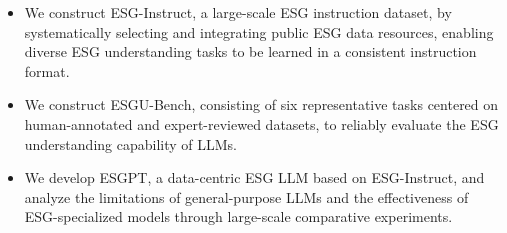 \documentclass[11pt]{article}
\begin{document}
\begin{itemize}
    \item We construct \textsf{ESG-Instruct}, a large-scale ESG instruction dataset, by systematically selecting and integrating public ESG data resources, enabling diverse ESG understanding tasks to be learned in a consistent instruction format.
    \item We construct \textsf{ESGU-Bench}, consisting of six representative tasks centered on human-annotated and expert-reviewed datasets, to reliably evaluate the ESG understanding capability of LLMs.
    \item We develop \textsf{ESGPT}, a data-centric ESG LLM based on \textsf{ESG-Instruct}, and analyze the limitations of general-purpose LLMs and the effectiveness of ESG-specialized models through large-scale comparative experiments.
\end{itemize}

\end{document}
